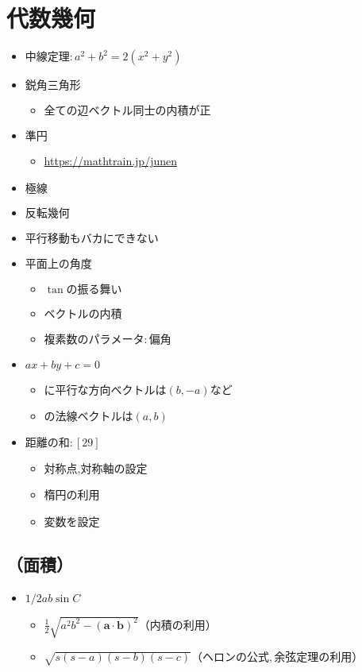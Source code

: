 \documentclass[dvipdfmx,uplatex]{jsarticle}
\begin{document}
\section{代数幾何}
\begin{itemize}
	\item $ 中線定理: a^2+b^2 = 2(x^2+y^2)$
	\item $ 鋭角三角形$
	\begin{itemize}
		\item $ 全ての辺ベクトル同士の内積が正$
	\end{itemize}
	\item $ 準円$
	\begin{itemize}
		\item \url{https://mathtrain.jp/junen}
	\end{itemize}
	\item $ 極線$
	\item $ 反転幾何$
	\item $ 平行移動もバカにできない$
	\item $ 平面上の角度$
	\begin{itemize}
		\item $ \tan の振る舞い$
		\item $ ベクトルの内積$
		\item $ 複素数のパラメータ:偏角$
	\end{itemize}
	\item $ ax+by+c=0$
	\begin{itemize}
		\item $ に平行な方向ベクトルは(b,-a)など$
		\item $ の法線ベクトルは(a,b)$
	\end{itemize}
	\item $ 距離の和:[29]$
	\begin{itemize}
		\item 対称点,対称軸の設定
		\item 楕円の利用
		\item 変数を設定
	\end{itemize}
\end{itemize}
\subsection{（面積）}
\begin{itemize}
	\item $ 1/2ab \sin C$
	\begin{itemize}
		\item $ \frac{1}{2} \sqrt{a^2b^2 - (\bm{a} \cdot \bm{b})^2} （内積の利用）$
		\item $ \sqrt{s(s-a)(s-b)(s-c)} （ヘロンの公式,余弦定理の利用）$
	\end{itemize}
\end{itemize}
\end{document}
